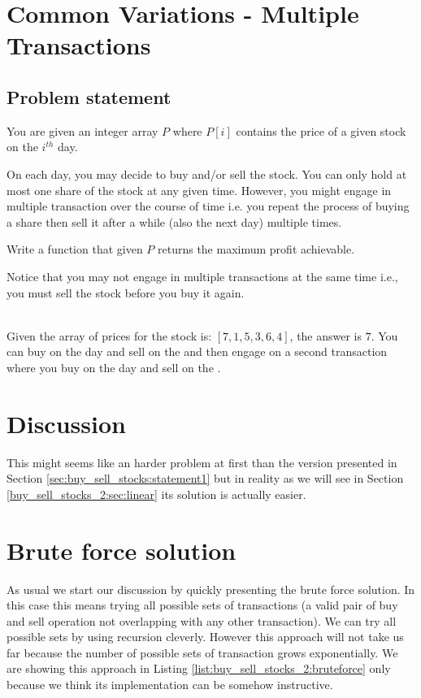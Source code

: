 \section{Common Variations - Multiple Transactions}
\label{sec:buy_sell_stocks:multiple_transaction}

\subsection{Problem statement}
\begin{exercise}
	You are given an integer array $P$ where $P[i]$ contains the price of a given stock on the $i^{th}$ day.

	On each day, you may decide to buy and/or sell the stock. 
	You can only hold at most one share of the stock at any given time.
	However, you might engage in multiple transaction over the course of time i.e. you repeat the process of buying a share then sell it after a while (also the next day) multiple times.
	
	Write a function that given $P$ returns the maximum profit achievable.

	Notice that you may not engage in multiple transactions at the same time i.e., you must sell the stock before you buy it again.
	\begin{example}
	\label{ex:buy_sell_stocks_2:exmaple1}
		\hfill \\
		Given the array of prices for the stock is: $[7,1,5,3,6,4]$, the answer is $7$. 
		You can buy on the  day and sell on the  and then engage on a second transaction where you buy on the  day and sell on the .
	\end{example}

\end{exercise}


\section{Discussion}
\label{buy_sell_stocks_2:sec:discussion}
This might seems like an harder problem at first than the version presented in Section \ref{sec:buy_sell_stocks:statement1} but in reality as we will see in Section \ref{buy_sell_stocks_2:sec:linear} its solution is actually easier.

\section{Brute force solution}
\label{buy_sell_stocks_2:sec:bruteforce}
As usual we start our discussion by quickly presenting the brute force solution. In this case this means trying all possible sets of transactions (a valid pair of buy and sell operation not overlapping with any other transaction). We can try all possible sets by using recursion cleverly. However this approach will not take us far because the number of possible sets of transaction grows exponentially.
We are showing this approach in Listing \ref{list:buy_sell_stocks_2:bruteforce}  only because we think its implementation can be somehow instructive.

